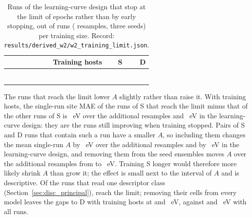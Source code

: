 \begin{table}[H]
\caption{Runs of the learning-curve design that stop at the limit of \numNetCapMaxEpochs{} epochs rather than by early stopping, out of \numNetCapRunsSixHundredFiftyFour{} runs (\numCfgSplitNOuterResamples{} resamples, three seeds) per training size. Record: \texttt{results/derived\_w2/w2\_training\_limit.json}.\label{tab:app_capped}}
\centering
\small
\begin{tabular}{rrr}
\toprule
Training hosts & S & D \\
\midrule
\numCfgBudgetsHostsItemOne{} & \numNetCapSTwentyFive{} & \numNetCapDTwentyFive{} \\
\numCfgBudgetsHostsItemTwo{} & \numNetCapSFifty{} & \numNetCapDFifty{} \\
\numCfgBudgetsHostsItemThree{} & \numNetCapSOneHundred{} & \numNetCapDOneHundred{} \\
\numCfgBudgetsHostsItemFour{} & \numNetCapSTwoHundred{} & \numNetCapDTwoHundred{} \\
\numCfgBudgetsHostsItemFive{} & \numNetCapSFourHundred{} & \numNetCapDFourHundred{} \\
\numCfgBudgetsHostsItemSix{} & \numNetCapSSixHundredFiftyFour{} & \numNetCapDSixHundredFiftyFour{} \\
\bottomrule
\end{tabular}
\end{table}

The runs that reach the limit lower $A$ slightly rather than raise it. With \numCfgBudgetsMax{} training hosts, the single-run site MAE of the runs of S that reach the limit minus that of the other runs of S is \numNetCapThirtyByFiveCappedMinusUncappedMaeS{}~eV over the additional resamples and \numNetCapSweepCappedMinusUncappedMaeS{}~eV in the learning-curve design: they are the runs still improving when training stopped. Pairs of S and D runs that contain such a run have a smaller $A$, so including them changes the mean single-run $A$ by \numNetCapThirtyByFiveEffectOnA{}~eV over the additional resamples and by \numNetCapSweepEffectOnA{}~eV in the learning-curve design, and removing them from the seed ensembles moves $A$ over the additional resamples from \numNetCapEnsembleAAll{} to \numNetCapEnsembleACappedRemoved{}~eV. Training S longer would therefore more likely shrink $A$ than grow it; the effect is small next to the interval of $A$ and is descriptive. Of the \numNetDclassRuns{} runs that read one descriptor class (Section~\ref{sec:disc_principal}), \numNetDclassCapRuns{} reach the limit; removing their \numNetDclassCapCells{} cells from every model leaves the gaps to D with \numCfgBudgetsMax{} training hosts at \numNetDclassSixHundredFiftyFourCapGapDHost{} and \numNetDclassSixHundredFiftyFourCapGapDSite{}~eV, against \numNetDclassSixHundredFiftyFourGapDHost{} and \numNetDclassSixHundredFiftyFourGapDSite{}~eV with all runs.


